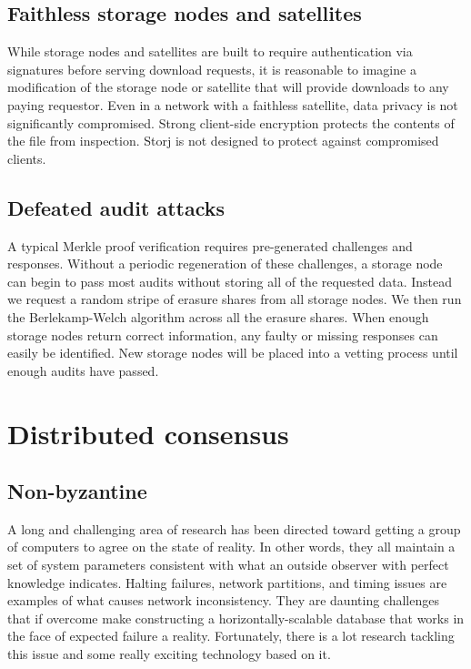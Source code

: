 \documentclass[11pt,fleqn,openany]{book}
\begin{document}
\section{Faithless storage nodes and satellites}

While storage nodes and satellites are built to require authentication via
signatures before serving download requests, it is reasonable to imagine a
modification of the storage node or satellite that will provide downloads to
any paying requestor.
Even in a network with a faithless satellite, data privacy is not significantly
compromised.
Strong client-side encryption protects the contents of the file from
inspection.
Storj is not designed to protect against compromised clients.

\section{Defeated audit attacks}

A typical Merkle proof verification requires pre-generated challenges and
responses.
Without a periodic regeneration of these challenges, a storage node can begin
to pass most audits without storing all of the requested data.
Instead we request a random stripe of erasure shares from all storage nodes.
We then run the Berlekamp-Welch algorithm\cite{bw} across all the
erasure shares.
When enough storage nodes return correct information, any faulty or missing
responses can easily be identified.
New storage nodes will be placed into a vetting process until enough audits
have passed.

\chapter{Distributed consensus}\label{chap:dist-consensus}

\section{Non-byzantine}

    A long and challenging area of research has been directed toward getting a
group of computers to agree on the state of reality. In other words, they all
maintain a set of system parameters consistent with what an outside observer with perfect knowledge indicates. Halting failures, network partitions, and timing issues \cite{google-distributed-system-design} are examples of what causes network inconsistency. They are daunting challenges that if overcome make constructing a horizontally-scalable database that works in the face of expected failure a reality. Fortunately, there is a lot research tackling this issue and some really exciting technology based on it.
\end{document}
